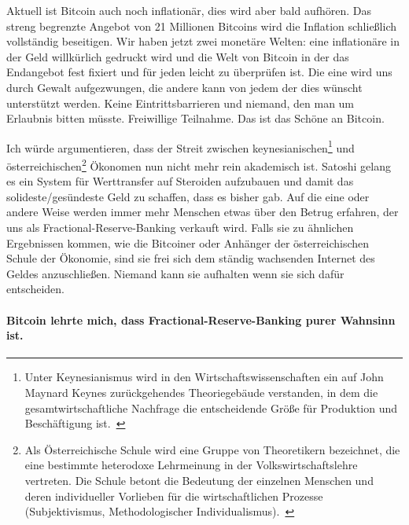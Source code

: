 Aktuell ist Bitcoin auch noch inflationär, dies wird aber bald aufhören. Das
streng begrenzte Angebot von 21 Millionen Bitcoins wird die Inflation
schließlich vollständig beseitigen. Wir haben jetzt zwei monetäre Welten: eine
inflationäre in der Geld willkürlich gedruckt wird und die Welt von Bitcoin in
der das Endangebot fest fixiert und für jeden leicht zu überprüfen ist. Die eine
wird uns durch Gewalt aufgezwungen, die andere kann von jedem der dies wünscht
unterstützt werden. Keine Eintrittsbarrieren und niemand, den man um Erlaubnis
bitten müsste. Freiwillige Teilnahme. Das ist das Schöne an Bitcoin.

Ich würde argumentieren, dass der Streit zwischen keynesianischen\footnote{Unter
Keynesianismus wird in den Wirtschaftswissenschaften ein auf John Maynard Keynes
zurückgehendes Theoriegebäude verstanden, in dem die gesamtwirtschaftliche
Nachfrage die entscheidende Größe für Produktion und Beschäftigung
ist.~\cite{wiki:keynesian}} und österreichischen\footnote{Als Österreichische
Schule wird eine Gruppe von Theoretikern bezeichnet, die eine bestimmte
heterodoxe Lehrmeinung in der Volkswirtschaftslehre vertreten. Die Schule betont
die Bedeutung der einzelnen Menschen und deren individueller Vorlieben für die
wirtschaftlichen Prozesse (Subjektivismus, Methodologischer
Individualismus).~\cite{wiki:austrian}} Ökonomen nun nicht mehr rein akademisch
ist. Satoshi gelang es ein System für Werttransfer auf Steroiden aufzubauen und
damit das solideste/gesündeste Geld zu schaffen, dass es bisher gab. Auf die
eine oder andere Weise werden immer mehr Menschen etwas über den Betrug
erfahren, der uns als Fractional-Reserve-Banking verkauft wird. Falls sie zu
ähnlichen Ergebnissen kommen, wie die Bitcoiner oder Anhänger der
österreichischen Schule der Ökonomie, sind sie frei sich dem ständig wachsenden
Internet des Geldes anzuschließen. Niemand kann sie aufhalten wenn sie sich
dafür entscheiden.

\paragraph{Bitcoin lehrte mich, dass Fractional-Reserve-Banking purer Wahnsinn ist.}

%
%
%
%
%
